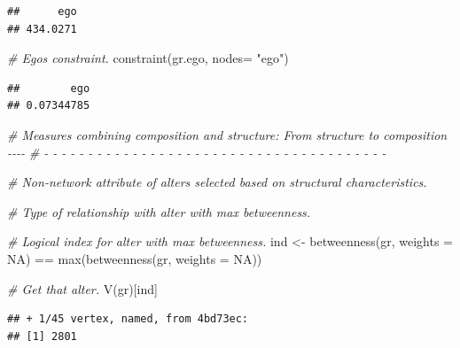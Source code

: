 \documentclass[
]{book}
\newenvironment{Shaded}{\begin{snugshade}}{\end{snugshade}}
\newcommand{\AttributeTok}[1]{\textcolor[rgb]{0.77,0.63,0.00}{#1}}
\newcommand{\CommentTok}[1]{\textcolor[rgb]{0.56,0.35,0.01}{\textit{#1}}}
\newcommand{\ConstantTok}[1]{\textcolor[rgb]{0.00,0.00,0.00}{#1}}
\newcommand{\FunctionTok}[1]{\textcolor[rgb]{0.00,0.00,0.00}{#1}}
\newcommand{\NormalTok}[1]{#1}
\newcommand{\OtherTok}[1]{\textcolor[rgb]{0.56,0.35,0.01}{#1}}
\newcommand{\SpecialCharTok}[1]{\textcolor[rgb]{0.00,0.00,0.00}{#1}}
\newcommand{\StringTok}[1]{\textcolor[rgb]{0.31,0.60,0.02}{#1}}
\begin{document}
\begin{verbatim}
##      ego 
## 434.0271
\end{verbatim}

\begin{Shaded}
\begin{Highlighting}[]
\CommentTok{\# Ego\textquotesingle{}s constraint.}
\FunctionTok{constraint}\NormalTok{(gr.ego, }\AttributeTok{nodes=} \StringTok{"ego"}\NormalTok{)}
\end{Highlighting}
\end{Shaded}

\begin{verbatim}
##        ego 
## 0.07344785
\end{verbatim}

\begin{Shaded}
\begin{Highlighting}[]
\CommentTok{\# Measures combining composition and structure: From structure to composition {-}{-}{-}{-}}
\CommentTok{\# {-} {-} {-} {-} {-} {-} {-} {-} {-} {-} {-} {-} {-} {-} {-} {-} {-} {-} {-} {-} {-} {-} {-} {-} {-} {-} {-} {-} {-} {-} {-} {-} {-} {-} {-} {-} {-} {-} {-} }

\CommentTok{\# Non{-}network attribute of alters selected based on structural characteristics.}

\CommentTok{\# Type of relationship with alter with max betweenness.}

\CommentTok{\# Logical index for alter with max betweenness.}
\NormalTok{ind }\OtherTok{\textless{}{-}} \FunctionTok{betweenness}\NormalTok{(gr, }\AttributeTok{weights =} \ConstantTok{NA}\NormalTok{) }\SpecialCharTok{==} \FunctionTok{max}\NormalTok{(}\FunctionTok{betweenness}\NormalTok{(gr, }\AttributeTok{weights =} \ConstantTok{NA}\NormalTok{))}

\CommentTok{\# Get that alter.}
\FunctionTok{V}\NormalTok{(gr)[ind]}
\end{Highlighting}
\end{Shaded}

\begin{verbatim}
## + 1/45 vertex, named, from 4bd73ec:
## [1] 2801
\end{verbatim}

\begin{Shaded}
\end{Shaded}
\end{document}

